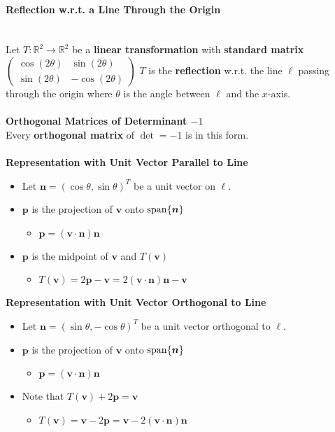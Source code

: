 \documentclass[../ma2001_notes.tex]{subfiles}
\begin{document}
\paragraph{Reflection w.r.t. a Line Through the Origin}\,\\
Let \(T:\mathbb{R}^2\to\mathbb{R}^2\) be a \textbf{linear transformation} with \textbf{standard matrix} \(\begin{pmatrix}
	\cos(2\theta) & \sin(2\theta) \\ \sin(2\theta) & -\cos(2\theta)
\end{pmatrix}\)
\(T\) is the \textbf{reflection} w.r.t. the line \(\ell\) passing through the origin where \(\theta\) is the angle between \(\ell\) and the \(x\)-axis.\\ \\
\textbf{Orthogonal Matrices of Determinant $-1$}\\
Every \textbf{orthogonal matrix} of \(\det=-1\) is in this form.
\\ \\
\textbf{Representation with Unit Vector Parallel to Line}
\begin{itemize}
	\item Let \(\bm{n}=(\cos\theta,\sin\theta)^T\) be a unit vector on \(\ell\).
	\item\(\bm{p}\) is the projection of \(\bm{v}\) onto \(\operatorname{span}\{\bm{n}\}\)
	\begin{itemize}
		\item\(\bm{p}=(\bm{v}\cdot\bm{n})\bm{n}\)
	\end{itemize}
	\item\(\bm{p}\) is the midpoint of \(\bm{v}\) and \(T(\bm{v})\)
	\begin{itemize}
		\item\(T(\bm{v})=2\bm{p}-\bm{v}=2(\bm{v}\cdot\bm{n})\bm{n}-\bm{v}\)
	\end{itemize}
\end{itemize}
\textbf{Representation with Unit Vector Orthogonal to Line}
\begin{itemize}
	\item Let \(\bm{n}=(\sin\theta,-\cos\theta)^T\) be a unit vector orthogonal to \(\ell\).
	\item\(\bm{p}\) is the projection of \(\bm{v}\) onto \(\operatorname{span}\{\bm{n}\}\)
	\begin{itemize}
		\item\(\bm{p}=(\bm{v}\cdot\bm{n})\bm{n}\)
	\end{itemize}
	\item Note that \(T(\bm{v})+2\bm{p}=\bm{v}\)
	\begin{itemize}
		\item\(T(\bm{v})=\bm{v}-2\bm{p}=\bm{v}-2(\bm{v}\cdot\bm{n})\bm{n}\)
	\end{itemize}
\end{itemize}
\end{document}
